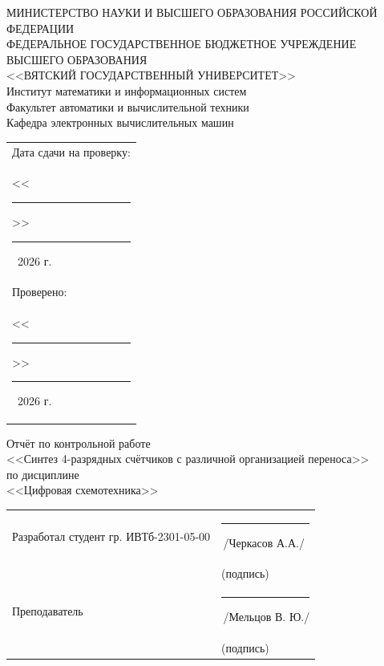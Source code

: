 \documentclass[oneside,a4paper,14pt]{extarticle}
\begin{document}
\newpage
\thispagestyle{empty}
\begin{center}
  МИНИСТЕРСТВО НАУКИ И ВЫСШЕГО ОБРАЗОВАНИЯ РОССИЙСКОЙ ФЕДЕРАЦИИ\\
  ФЕДЕРАЛЬНОЕ ГОСУДАРСТВЕННОЕ БЮДЖЕТНОЕ УЧРЕЖДЕНИЕ ВЫСШЕГО ОБРАЗОВАНИЯ\\
  <<ВЯТСКИЙ ГОСУДАРСТВЕННЫЙ УНИВЕРСИТЕТ>>\\
  Институт математики и информационных систем\\
  Факультет автоматики и вычислительной техники\\
  Кафедра электронных вычислительных машин
\end{center}
\vspace{10mm}

\hfill
\begin{tabular}{l}
  \footnotesize Дата сдачи на проверку:                                          \\
  \footnotesize <<\rule[-1mm]{5mm}{0.10mm}\/>>\rule[-1mm]{20mm}{0.10mm}\ 2026 г. \\
  \footnotesize Проверено:                                                       \\
  \footnotesize <<\rule[-1mm]{5mm}{0.10mm}\/>>\rule[-1mm]{20mm}{0.10mm}\ 2026 г. \\
\end{tabular}
\vfill

\begin{center}
  Отчёт по контрольной работе\\
  <<Синтез 4-разрядных счётчиков с различной организацией переноса>>\\
  по дисциплине\\
  <<Цифровая схемотехника>>\\
\end{center}
\vspace{25mm}
\noindent
\begin{tabular}{ll}
  Разработал студент гр. ИВТб-2301-05-00 & \hspace{20mm}\rule[-1mm]{30mm}{0.10mm}\,/Черкасов А.А./ \\
                                 & \hspace{27.5mm}\footnotesize(подпись)                   \\
  Преподаватель                  & \hspace{20mm}\rule[-1mm]{30mm}{0.10mm}\,/Мельцов В. Ю./  \\
                                 & \hspace{27.5mm}\footnotesize(подпись)                   \\
\end{tabular}
\end{document}
